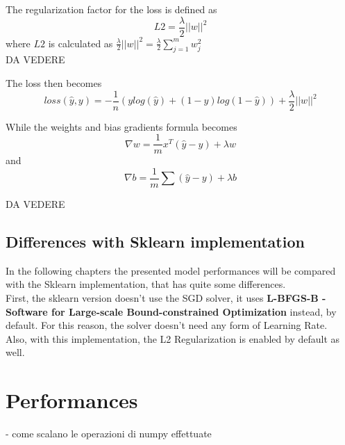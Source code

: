 \documentclass[
	letterpaper, %
	10pt, %
]{class}
\begin{document}
The regularization factor for the loss is defined as
$$ L2 = \frac{\lambda}{2}||w||^2 $$
where $L2$ is calculated as $ \frac{\lambda}{2}||w||^2 = \frac{\lambda}2{\displaystyle\sum_{j=1}^m w_j^2} $ \\
DA VEDERE

The loss then becomes
$$ loss(\hat{y}, y) = -\frac{1}{n}(y log(\hat{y}) + (1-y)log(1-\hat{y})) + \frac{\lambda}{2}||w||^2 $$

While the weights and bias gradients formula becomes
$$ \nabla w = \frac{1}{m}x^T(\hat{y} - y) + \lambda w $$
and
$$ \nabla b = \frac{1}{m}\sum(\hat{y} - y) + \lambda b$$

DA VEDERE

\subsection{Differences with Sklearn implementation}

In the following chapters the presented model performances will be compared with the Sklearn implementation, that has quite some differences.\\
First, the sklearn version doesn't use the SGD solver, it uses \textbf{L-BFGS-B - Software for Large-scale Bound-constrained Optimization} instead, by default.
For this reason, the solver doesn't need any form of Learning Rate.\\
Also, with this implementation, the L2 Regularization is enabled by default as well.



\section{Performances}

- come scalano le operazioni di numpy effettuate

\end{document}
